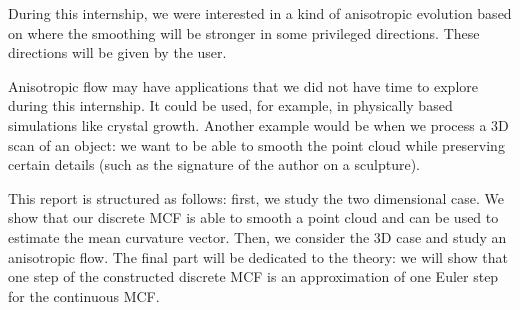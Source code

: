 During this internship, we were interested in a kind of anisotropic evolution
based on \cite{chambolle2012nonlocal} where the smoothing will be stronger in
some privileged directions. These directions will be given by the user.

Anisotropic flow may have applications that we did not have time to explore
during this internship. It could be used, for example, in physically based
simulations like crystal growth. Another example would be when we
process a 3D scan of an object: we want to be able to smooth the point cloud
while preserving certain details (such as the signature of the author on a
sculpture).

This report is structured as follows: first, we study the two dimensional case.
We show that our discrete MCF is able to smooth a point cloud and can be used to
estimate the mean curvature vector. Then, we consider the 3D case and study an
anisotropic flow. The final part will be dedicated to the theory: we will show
that one step of the constructed discrete MCF is an approximation of one Euler
step for the continuous MCF.



